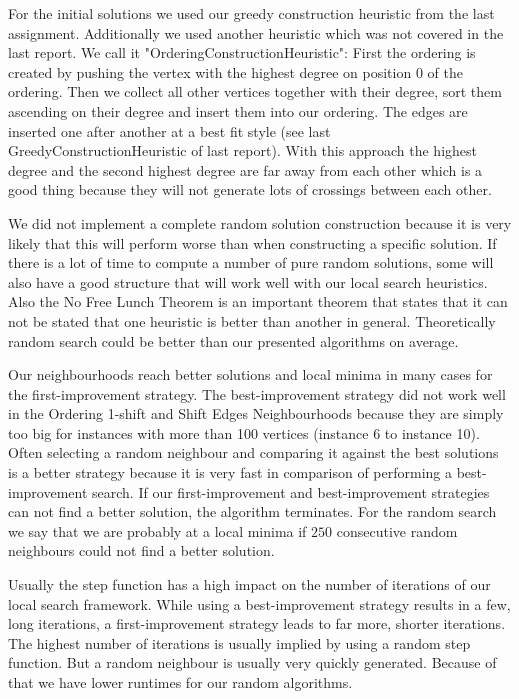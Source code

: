 \documentclass[11pt]{article}
\begin{document}
For the initial solutions we used our greedy construction heuristic from the last assignment.
Additionally we used another heuristic which was not covered in the last report. We call it "OrderingConstructionHeuristic":
First the ordering is created by pushing the vertex with the highest degree on position $0$ of the ordering.
Then we collect all other vertices together with their degree, sort them ascending on their degree and insert them into our ordering.
The edges are inserted one after another at a best fit style (see last GreedyConstructionHeuristic of last report).
With this approach the highest degree and the second highest degree are far away from each other which is a good thing because they will not generate lots of crossings between each other.

We did not implement a complete random solution construction because it is very likely that this will perform worse than when constructing a specific solution.
If there is a lot of time to compute a number of pure random solutions, some will also have a good structure that will work well with our local search heuristics.
Also the No Free Lunch Theorem is an important theorem that states that it can not be stated that one heuristic is better than another in general.
Theoretically random search could be better than our presented algorithms on average.

Our neighbourhoods reach better solutions and local minima in many cases for the first-improvement strategy.
The best-improvement strategy did not work well in the Ordering 1-shift and Shift Edges Neighbourhoods because they are simply too big for instances with more than 100 vertices (instance 6 to instance 10).
Often selecting a random neighbour and comparing it against the best solutions is a better strategy because it is very fast in comparison of performing a best-improvement search.
If our first-improvement and best-improvement strategies can not find a better solution, the algorithm terminates.
For the random search we say that we are probably at a local minima if $250$ consecutive random neighbours could not find a better solution.

Usually the step function has a high impact on the number of iterations of our local search framework.
While using a best-improvement strategy results in a few, long iterations, a first-improvement strategy leads to far more, shorter iterations.
The highest number of iterations is usually implied by using a random step function.
But a random neighbour is usually very quickly generated. Because of that we have lower runtimes for our random algorithms.
\end{document}
